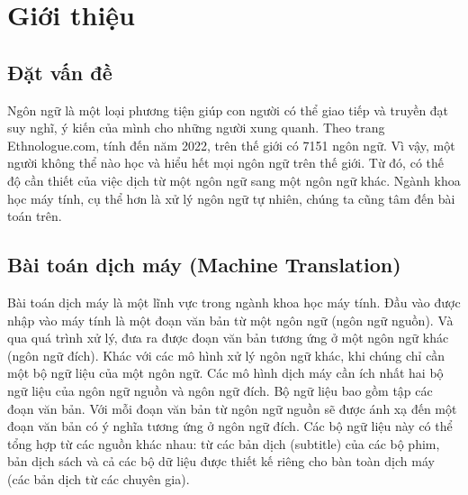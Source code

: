 \chapter{Giới thiệu}
\label{Chapter1}



\section{Đặt vấn đề}
Ngôn ngữ là một loại phương tiện giúp con người có thể giao tiếp và truyền đạt suy nghĩ, ý kiến của mình cho những người xung quanh. Theo trang Ethnologue.com, tính đến năm 2022, trên thế giới có 7151 ngôn ngữ. Vì vậy, một người không thể nào học và hiểu hết mọi ngôn ngữ trên thế giới. Từ đó, có thế độ cần thiết của việc dịch từ một ngôn ngữ sang một ngôn ngữ khác. Ngành khoa học máy tính, cụ thể hơn là xử lý ngôn ngữ tự nhiên, chúng ta cũng tâm đến bài toán trên.

\section{Bài toán dịch máy (Machine Translation)}

Bài toán dịch máy là một lĩnh vực trong ngành khoa học máy tính. Đầu vào được nhập vào máy tính là một đoạn văn bản từ một ngôn ngữ (ngôn ngữ nguồn). Và qua quá trình xử lý, đưa ra được đoạn văn bản tương ứng ở một ngôn ngữ khác (ngôn ngữ đích). Khác với các mô hình xử lý ngôn ngữ khác, khi chúng chỉ cần một bộ ngữ liệu của một ngôn ngữ. Các mô hình dịch máy cần ích nhất hai bộ ngữ liệu của ngôn ngữ nguồn và ngôn ngữ đích. Bộ ngữ liệu bao gồm tập các đoạn văn bản. Với mỗi đoạn văn bản từ ngôn ngữ nguồn sẽ được ánh xạ đến một đoạn văn bản có ý nghĩa tương ứng ở ngôn ngữ đích. Các bộ ngữ liệu này có thể tổng hợp từ các nguồn khác nhau: từ các bản dịch (subtitle) của các bộ phim, bản dịch sách và cả các bộ dữ liệu được thiết kế riêng cho bàn toàn dịch máy (các bản dịch từ các chuyên gia).

